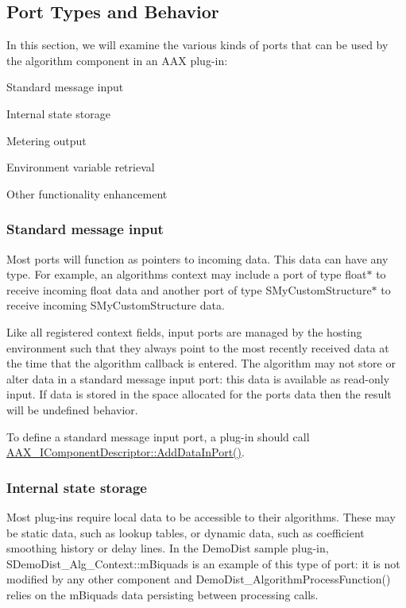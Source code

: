  \hypertarget{a00327_alg_porttypes}{}\subsection{Port Types and Behavior}\label{a00327_alg_porttypes}
In this section, we will examine the various kinds of ports that can be used by the algorithm component in an A\+A\+X plug-\/in\+: 
\begin{DoxyEnumerate}
\item Standard message input  
\item Internal state storage  
\item Metering output  
\item Environment variable retrieval  
\item Other functionality enhancement  
\end{DoxyEnumerate}

\hypertarget{a00327_subsection__standard_message_input}{}\subsubsection{Standard message input}\label{a00327_subsection__standard_message_input}
Most ports will function as pointers to incoming data. This data can have any type. For example, an algorithm\textquotesingle{}s context may include a port of type float$\ast$ to receive incoming float data and another port of type {\ttfamily S\+My\+Custom\+Structure}$\ast$ to receive incoming {\ttfamily S\+My\+Custom\+Structure} data.

Like all registered context fields, input ports are managed by the hosting environment such that they always point to the most recently received data at the time that the algorithm callback is entered. The algorithm may not store or alter data in a standard message input port\+: this data is available as read-\/only input. If data is stored in the space allocated for the port\textquotesingle{}s data then the result will be undefined behavior.

To define a standard message input port, a plug-\/in should call \hyperlink{a00088_a230293b9f6bb413626cd487ca501df75}{A\+A\+X\+\_\+\+I\+Component\+Descriptor\+::\+Add\+Data\+In\+Port()}.

\hypertarget{a00327_subsection__internal_state_storage}{}\subsubsection{Internal state storage}\label{a00327_subsection__internal_state_storage}
Most plug-\/ins require local data to be accessible to their algorithms. These may be static data, such as lookup tables, or dynamic data, such as coefficient smoothing history or delay lines. In the Demo\+Dist sample plug-\/in, {\ttfamily S\+Demo\+Dist\+\_\+\+Alg\+\_\+\+Context\+::m\+Biquads} is an example of this type of port\+: it is not modified by any other component and {\ttfamily Demo\+Dist\+\_\+\+Algorithm\+Process\+Function()} relies on the {\ttfamily m\+Biquads} data persisting between processing calls.

